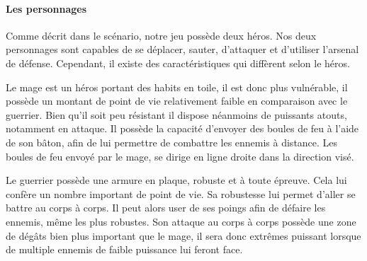 \documentclass[a4paper, 12pt]{article}
\begin{document}
			\paragraph{Les personnages}
			Comme décrit dans le scénario, notre jeu possède deux héros. Nos deux personnages sont capables de se déplacer, sauter, d’attaquer et d’utiliser l’arsenal de défense. Cependant, il existe des caractéristiques qui diffèrent selon le héros.
\par Le mage est un héros portant des habits en toile, il est donc plus vulnérable, il possède un montant de point de vie relativement faible en comparaison avec le guerrier. Bien qu’il soit peu résistant il dispose néanmoins de puissants atouts, notamment en attaque. 
Il possède la capacité d’envoyer des boules de feu à l’aide de son bâton, afin de lui permettre de combattre les ennemis à distance. Les boules de feu envoyé par le mage, se dirige en ligne droite dans la direction visé.
\par Le guerrier possède une armure en plaque, robuste et à toute épreuve. Cela lui confère un nombre important de point de vie. Sa robustesse lui permet d’aller se battre au corps à corps. Il peut alors user de ses poings afin de défaire les ennemis, même les plus robustes. Son attaque au corps à corps possède une zone de dégâts bien plus important que le mage, il sera donc extrêmes puissant lorsque de multiple ennemis de faible puissance lui feront face.
\end{document}
